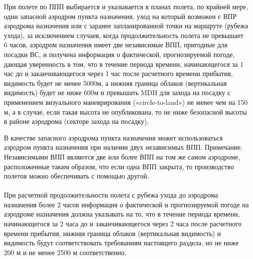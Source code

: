 При полете по ППП выбирается и указывается в планах полета, по крайней мере, один запасной аэродром пункта назначения, уход на который возможен с ВПР аэродрома назначения или с заранее запланированной точки на маршруте (рубежа ухода), за исключением случаев, когда продолжительность полета не превышает 6 часов, аэродром назначения имеет две независимые ВПП, пригодные для посадки ВС, и получена информация о фактической, прогнозируемой погоде, дающая уверенность в том, что в течение периода времени, начинающегося за 1 час до и заканчивающегося через 1 час после расчетного времени прибытия, видимость будет не менее 5000м, а нижняя граница облаков (вертикальная видимость) будет не ниже 600м и превышать MDH для захода на посадку с применением визуального маневрирования («circle-to-land») не менее чем на 150 м, а в случае, если такая высота не опубликована, то не ниже безопасной высоты в районе аэродрома (секторе захода на посадку).

В качестве запасного аэродрома пункта назначения может использоваться аэродром пункта назначения при наличии двух независимых ВПП.
Примечание. Независимыми ВПП являются две или более ВПП на том же самом аэродроме, расположенные таким образом, что если одна ВПП закрыта, то производство полетов можно обеспечивать с помощью другой.

\paragraph{} \label{par:alt0}При расчетной продолжительности полета с рубежа ухода до аэродрома назначения более 2 часов информация о фактической и прогнозируемой погоде на аэродроме назначения должна указывать на то, что в течение периода времени, начинающегося за 2 часа до и заканчивающегося через 2 часа после расчетного времени прибытия, нижняя граница облаков (вертикальная видимость) и видимость будут соответствовать требованиям настоящего раздела, но не ниже 200 м и не менее 2500 м соответственно.

